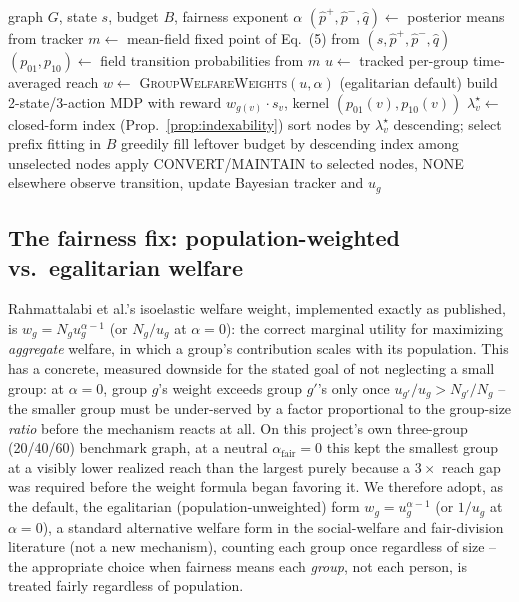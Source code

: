 \documentclass[journal]{IEEEtran}
\begin{document}
\begin{algorithm}[t]
\caption{MF-BWI-Fair, one round}
\label{alg:mfbwi}
\begin{algorithmic}[1]
\REQUIRE graph $G$, state $s$, budget $B$, fairness exponent $\alpha$
\STATE $(\hat p^+,\hat p^-,\hat q) \gets$ posterior means from tracker
\STATE $m \gets$ mean-field fixed point of Eq.~(5) from $(s,\hat p^+,\hat p^-,\hat q)$
\STATE $(p_{01}, p_{10}) \gets$ field transition probabilities from $m$
\STATE $u \gets$ tracked per-group time-averaged reach
\STATE $w \gets$ \textsc{GroupWelfareWeights}$(u, \alpha)$ \hfill (egalitarian default)
  \STATE build 2-state/3-action MDP with reward $w_{g(v)}\cdot s_v$, kernel $(p_{01}(v), p_{10}(v))$
  \STATE $\lambda^\star_v \gets$ closed-form index (Prop.~\ref{prop:indexability})
\ENDFOR
\STATE sort nodes by $\lambda^\star_v$ descending; select prefix fitting in $B$
\STATE greedily fill leftover budget by descending index among unselected nodes
\STATE apply CONVERT/MAINTAIN to selected nodes, NONE elsewhere
\STATE observe transition, update Bayesian tracker and $u_g$
\end{algorithmic}
\end{algorithm}

\subsection{The fairness fix: population-weighted vs.\ egalitarian welfare}
\label{sec:fairness-fix}

Rahmattalabi et al.'s isoelastic welfare weight, implemented exactly as
published, is $w_g=N_g u_g^{\alpha-1}$ (or $N_g/u_g$ at $\alpha=0$): the
correct marginal utility for maximizing \emph{aggregate} welfare, in which
a group's contribution scales with its population. This has a concrete,
measured downside for the stated goal of not neglecting a small group: at
$\alpha=0$, group $g$'s weight exceeds group $g'$'s only once
$u_{g'}/u_g > N_{g'}/N_g$ -- the smaller group must be under-served by a
factor proportional to the group-size \emph{ratio} before the mechanism
reacts at all. On this project's own three-group (20/40/60) benchmark
graph, at a neutral $\alpha_{\mathrm{fair}}=0$ this kept the smallest group
at a visibly lower realized reach than the largest purely because a
$3\times$ reach gap was required before the weight formula began favoring
it. We therefore adopt, as the default, the egalitarian
(population-unweighted) form $w_g=u_g^{\alpha-1}$ (or $1/u_g$ at
$\alpha=0$), a standard alternative welfare form in the social-welfare and
fair-division literature (not a new mechanism), counting each group once
regardless of size -- the appropriate choice when fairness means each
\emph{group}, not each person, is treated fairly regardless of population.
\end{document}
